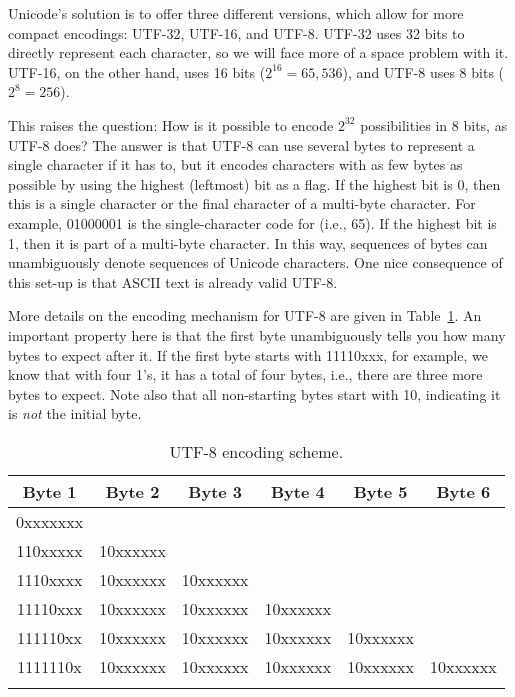Unicode's solution is to offer three different versions, which
allow for more compact encodings: UTF-32, UTF-16, and UTF-8.  UTF-32
uses 32 bits to directly represent each character, so we will face
more of a space problem with it.  UTF-16, on the other hand, uses 16
bits ($2^{16} = 65,536$), and UTF-8 uses 8 bits ($2^{8} = 256$).

This raises the question: How is it possible to encode $2^{32}$
possibilities in 8 bits, as UTF-8 does?  The answer is that UTF-8 can
use several bytes to represent a single character if it has to, but it
encodes characters with as few bytes as possible by using the highest
(leftmost) bit as a flag.  If the highest bit is 0, then this
is a single character or the final character of a multi-byte
character.  For example, 01000001 is the single-character code for
 (i.e., 65).  If the highest bit is 1, then it is part of a
multi-byte character.  In this way, sequences of bytes can
unambiguously denote sequences of Unicode characters.  One nice
consequence of this set-up is that ASCII text is already valid UTF-8.

More details on the encoding mechanism for UTF-8 are given in
Table~\ref{fig:utf8-bytes}.  An important property here is that the
first byte unambiguously tells you how many bytes to expect after it.
If the first byte starts with 11110xxx, for example, we know that with
four 1's, it has a total of four bytes, i.e., there are three more
bytes to expect.  Note also that all non-starting bytes start with 10,
indicating it is \emph{not} the initial byte.

  \begin{table}
    \begin{tabular}{cccccc}
    \lsptoprule
      Byte 1 & Byte 2 & Byte 3 & Byte 4 & Byte 5 & Byte 6 \\\midrule
      0xxxxxxx & \\
      110xxxxx & 10xxxxxx \\
      1110xxxx & 10xxxxxx & 10xxxxxx\\
      11110xxx & 10xxxxxx & 10xxxxxx & 10xxxxxx\\
      111110xx & 10xxxxxx & 10xxxxxx & 10xxxxxx & 10xxxxxx\\
      1111110x & 10xxxxxx & 10xxxxxx & 10xxxxxx & 10xxxxxx & 10xxxxxx\\
    \lspbottomrule
    \end{tabular}
  \caption{UTF-8 encoding scheme.}
  \label{fig:utf8-bytes}
  \end{table}

